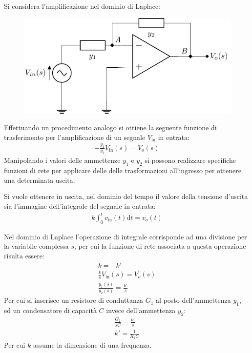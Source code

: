 \documentclass{article}
\newcommand{\df}{\mathrm{d}}
\numberwithin{equation}{subsection}
\begin{document}
Si considera l'amplificazione nel dominio di Laplace:
\begin{figure}[H]%
    \centering
    \includegraphics{amplificazione-invertente-laplace.pdf}%
    \label{fig:amplificazione-invertente-laplace}
\end{figure}

Effettuando un procedimento analogo si ottiene la seguente funzione di trasferimento per l'amplificazione di un segnale $V_\mathrm{in}$ in entrata:
\begin{gather*}
    \displaystyle-\frac{y_1}{y_2}V_\mathrm{in}(s)=V_o(s)
\end{gather*}
Manipolando i valori delle ammettenze $y_1$ e $y_2$ si possono realizzare specifiche funzioni di rete per applicare delle delle trasformazioni 
all'ingresso per ottenere una determinata uscita. 

Si vuole ottenere in uscita, nel dominio del tempo il valore della tensione d'uscita sia l'immagine dell'integrale del segnale in entrata:
\begin{gather*}
    \displaystyle k\int_{0}^tv_\mathrm{in}(t)\df t=v_o(t)
\end{gather*} 

Nel dominio di Laplace l'operazione di integrale corrisponde ad una divisione per la variabile complessa $s$, per cui la funzione di rete 
associata a questa operazione risulta essere:
\begin{gather*}
    k=-k'\\
    \displaystyle\frac{k}{s}V_\mathrm{in}(s)=V_o(s)\\
    \displaystyle\frac{y_1(s)}{y_2(s)}=\frac{k'}{s}
\end{gather*}
Per cui si inserisce un resistore di conduttanza $G_1$ al posto dell'ammettenza $y_1$, ed un condensatore di capacità $C$ invece dell'ammettenza $y_2$:
\begin{gather*}
    \displaystyle\frac{G_1}{sC}=\frac{k'}{s}\\
    k'=\displaystyle\frac{1}{R_1C}
\end{gather*} 
Per cui $k$ assume la dimensione di una frequenza. 
\end{document}

